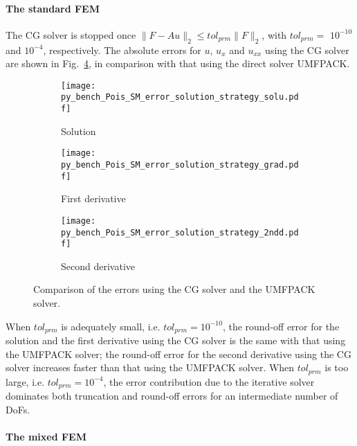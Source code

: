 \documentclass[review,3p]{elsarticle}
\begin{document}
\paragraph{The standard FEM}

The CG solver is stopped once $\|F-Au\|_2 \leqslant tol_{prm}\|F\|_2$, with $tol_{prm}=$ $10^{-10}$ and $10^{-4}$, respectively. 
The absolute errors for $u$, $u_{x}$ and $u_{xx}$ using the CG solver are shown in Fig.~\ref{py_bench_Pois_SM_error_solution_strategy}, in comparison with that using the direct solver UMFPACK. 

\begin{figure}[!ht]
    \begin{subfigure}{5.5cm}
        \texttt{[image: py\_bench\_Pois\_SM\_error\_solution\_strategy\_solu.pdf]}
        \caption{Solution}
        \label{py_bench_Pois_SM_error_solution_strategy_solu}
    \end{subfigure}
    \hspace{-0.2cm}
    \begin{subfigure}{5.5cm}
        \texttt{[image: py\_bench\_Pois\_SM\_error\_solution\_strategy\_grad.pdf]}
        \caption{First derivative}
        \label{py_bench_Pois_SM_error_solution_strategy_grad}
    \end{subfigure}
    \hspace{-0.2cm}
    \begin{subfigure}{5.5cm}
        \texttt{[image: py\_bench\_Pois\_SM\_error\_solution\_strategy\_2ndd.pdf]}
        \caption{Second derivative}
        \label{py_bench_Pois_SM_error_solution_strategy_2ndd}
    \end{subfigure}
\caption{Comparison of the errors using the CG solver and the UMFPACK solver.}
\label{py_bench_Pois_SM_error_solution_strategy}
\end{figure}

When $tol_{prm}$ is adequately small, i.e. $tol_{prm}=10^{-10}$, the round-off error for the solution and the first derivative using the CG solver is the same with that using the UMFPACK solver; the round-off error for the second derivative using the CG solver increases faster than that using the UMFPACK solver.
When $tol_{prm}$ is too large, i.e. $tol_{prm}=10^{-4}$, the error contribution due to the iterative solver dominates both truncation and round-off errors for an intermediate number of DoFs. 

\paragraph{The mixed FEM}
\end{document}
